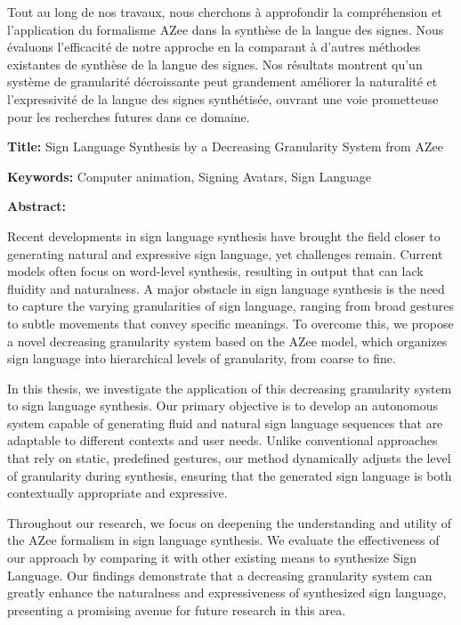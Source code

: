 \documentclass[english,12pt,a4paper]{book}
\begin{document}
\begin{mdframed}[linecolor=Prune,linewidth=1]
\begin{multicols}{2}
Tout au long de nos travaux, nous cherchons à approfondir la compréhension et l'application du formalisme AZee dans la synthèse de la langue des signes. Nous évaluons l'efficacité de notre approche en la comparant à d'autres méthodes existantes de synthèse de la langue des signes. Nos résultats montrent qu'un système de granularité décroissante peut grandement améliorer la naturalité et l'expressivité de la langue des signes synthétisée, ouvrant une voie prometteuse pour les recherches futures dans ce domaine.
\end{multicols}

\end{mdframed}

\newpage

\vspace{8mm}

\begin{mdframed}[linecolor=Prune,linewidth=1]

\textbf{Title:} Sign Language Synthesis by a Decreasing Granularity System from AZee

\noindent \textbf{Keywords:} Computer animation, Signing Avatars, Sign Language

\begin{multicols}{2}
\noindent \textbf{Abstract:}

Recent developments in sign language synthesis have brought the field closer to generating natural and expressive sign language, yet challenges remain. Current models often focus on word-level synthesis, resulting in output that can lack fluidity and naturalness. A major obstacle in sign language synthesis is the need to capture the varying granularities of sign language, ranging from broad gestures to subtle movements that convey specific meanings. To overcome this, we propose a novel decreasing granularity system based on the AZee model, which organizes sign language into hierarchical levels of granularity, from coarse to fine.

In this thesis, we investigate the application of this decreasing granularity system to sign language synthesis. Our primary objective is to develop an autonomous system capable of generating fluid and natural sign language sequences that are adaptable to different contexts and user needs. Unlike conventional approaches that rely on static, predefined gestures, our method dynamically adjusts the level of granularity during synthesis, ensuring that the generated sign language is both contextually appropriate and expressive.

Throughout our research, we focus on deepening the understanding and utility of the AZee formalism in sign language synthesis. We evaluate the effectiveness of our approach by comparing it with other existing means to synthesize Sign Language. Our findings demonstrate that a decreasing granularity system can greatly enhance the naturalness and expressiveness of synthesized sign language, presenting a promising avenue for future research in this area.

\end{multicols}
\end{mdframed}
\end{document}

